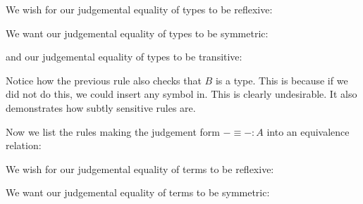 \begin{defin}

    We wish for our judgemental equality of types to be reflexive:
    \begin{prooftree}
    \end{prooftree}

    We want our judgemental equality of types to be symmetric:
    \begin{prooftree}
    \end{prooftree}

    and our judgemental equality of types to be transitive:

    \begin{prooftree}
    \end{prooftree}

    Notice how the previous rule also checks that $B$ is a type. This is because if we did not do this, we could insert any symbol in. This is clearly undesirable. It also demonstrates how subtly sensitive rules are.

    Now we list the rules making the judgement form $- \equiv - : A$ into an equivalence relation:

    We wish for our judgemental equality of terms to be reflexive:
    \begin{prooftree}
    \end{prooftree}

    We want our judgemental equality of terms to be symmetric:
    \begin{prooftree}
    \end{prooftree}


\end{defin}
